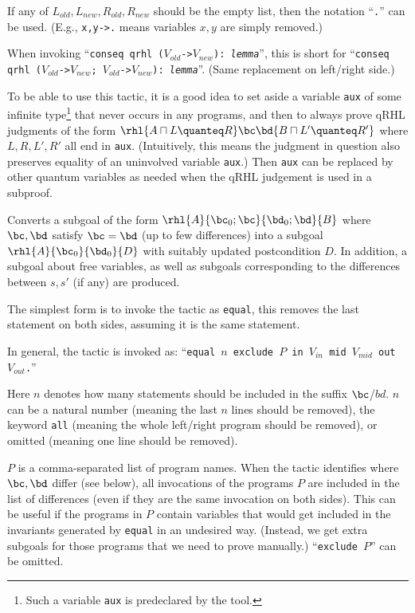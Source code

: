 \documentclass{article}
\begin{document}
If any of
$L_\mathit{old},L_\mathit{new},R_\mathit{old},R_\mathit{new}$ should
be the empty list, then the notation ``\texttt{.}'' can be
used. (E.g., \texttt{x,y->.} means variables $x,y$ are simply
removed.)

When invoking ``\texttt{conseq qrhl
  ($V_\mathit{old}$->$V_\mathit{new}$): \textit{lemma}}'', this is
short for ``\texttt{conseq qrhl ($V_\mathit{old}$->$V_\mathit{new}$;
  $V_\mathit{old}$->$V_\mathit{new}$): \textit{lemma}}''. (Same
replacement on left/right side.)

To be able to use this tactic, it is a good idea to set aside a
variable \texttt{aux} of some infinite type\footnote{Such a variable
  \texttt{aux} is predeclared by the tool.} that never occurs in any
programs, and then to always prove qRHL judgments of the form
$\rhl{A \sqcap L\quanteq R}\bc\bd {B \sqcap L'\quanteq R'}$ where
$L,R,L',R'$ all end in \texttt{aux}. (Intuitively, this means the
judgment in question also preserves equality of an uninvolved variable
\texttt{aux}.) Then \texttt{aux} can be replaced by other quantum
variables as needed when the qRHL judgement is used in a subproof.



Converts a subgoal of the form
$\rhl{A}{\bc_0;\bc}{\bd_0;\bd}{B}$
where $\bc,\bd$ satisfy $\bc=\bd$ (up to few differences)
into a subgoal $\rhl{A}{\bc_0}{\bd_0}{D}$
with suitably updated postcondition $D$.
In addition, a subgoal about free variables,
as well as subgoals corresponding to the differences between $s,s'$ (if any) are produced.

The simplest form is to invoke the tactic as \texttt{equal}, this
removes the last statement on both sides, assuming it is the same
statement.

In general, the tactic is invoked as: ``\texttt{equal $n$ exclude $P$
  in $V_\mathit{in}$ mid $V_\mathit{mid}$ out $V_\mathit{out}$.}''

Here $n$ denotes how many statements should be included in the suffix
$\bc$/$bd$. $n$ can be a natural number (meaning the last $n$ lines
should be removed), the keyword \texttt{all} (meaning the whole
left/right program should be removed), or omitted (meaning one line
should be removed).

$P$ is a comma-separated list of program names. When the tactic
identifies where $\bc,\bd$ differ (see below), all invocations of the
programs $P$ are included in the list of differences (even if they are
the same invocation on both sides). This can be useful if the programs
in $P$ contain variables that would get included in the invariants
generated by \texttt{equal} in an undesired way. (Instead, we get
extra subgoals for those programs that we need to prove manually.)
``\texttt{exclude $P$}'' can be omitted.
\end{document}

